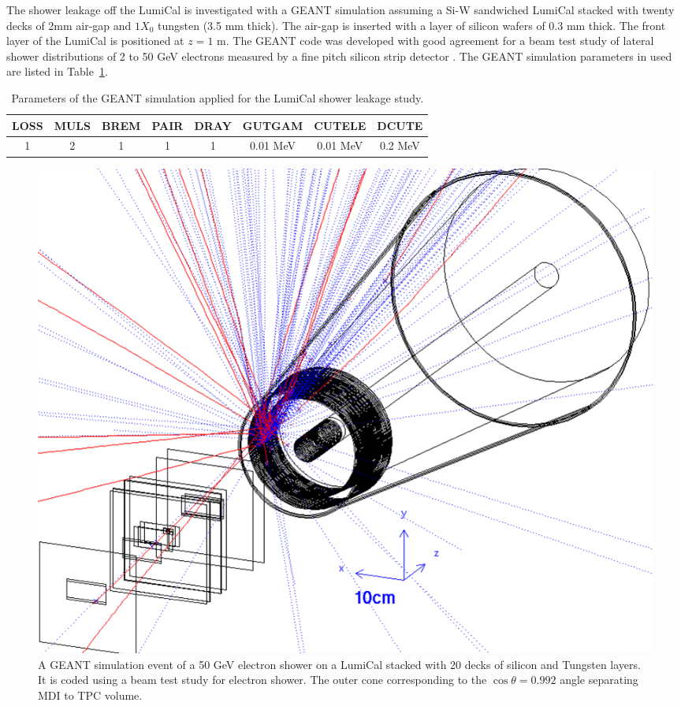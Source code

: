 The shower leakage off the LumiCal is investigated with a GEANT 
simulation assuming a Si-W sandwiched LumiCal stacked with twenty 
decks of 2mm air-gap and $1 X_0$ tungsten (3.5 mm thick). 
The air-gap is inserted with a layer of silicon wafers of 0.3 mm thick.
The front layer of the LumiCal is positioned at $z=1$ m.
The GEANT code was developed with good agreement for a beam test study of
lateral shower distributions of 2 to 50 GeV electrons measured by a fine pitch 
silicon strip detector \cite{NIM_lateral}. 
The GEANT simulation parameters in used are listed in
Table~\ref{tab:g3_parameters}. 

\begin{table}[t!]
	\centering
	\begin{tabular}{   ccccc | ccc }
		\hline
		\hline 
		LOSS & MULS & BREM & PAIR & DRAY &  GUTGAM   & CUTELE   & DCUTE \\
		\hline
		1 & 2 & 1 & 1 & 1 &  0.01 MeV & 0.01 MeV & 0.2 MeV \\
		\hline
		\hline
	\end{tabular}
	\caption{ Parameters of the GEANT simulation applied for the LumiCal
		shower leakage study.
		\label{tab:g3_parameters} }
\end{table}


\begin{figure}[th!] 
	\vspace{.5cm}
	\centering
	\includegraphics[width=.50\linewidth]{Figures/MDI/g3_event_display.png}   
	\vspace{.2cm}
	\caption{ A GEANT simulation event of a 50 GeV electron shower on
		a LumiCal stacked with 20 decks of silicon and Tungsten layers.
		It is coded using a beam test study for electron shower. 
		The outer cone corresponding to the $\cos\theta=0.992$ angle 
		separating MDI to TPC volume.
		\label{fig:g3_event} }
\end{figure}


